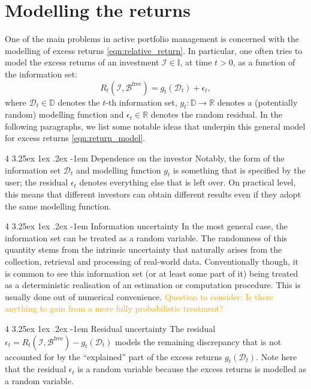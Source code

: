 \documentclass[12pt]{article}
\makeatletter
\renewcommand\paragraph{%
	\@startsection{paragraph}
	{4}
	{\z@}
	{3.25ex \@plus1ex \@minus.2ex}
	{-1em}
	{\normalfont\normalsize\bfseries\maybe@addperiod}%
}
\newcommand{\maybe@addperiod}[1]{%
	#1\@addpunct{.}%
}
\makeatother
\begin{document}
\section{Modelling the returns}
One of the main problems in active portfolio management is concerned with the modelling of excess returns \eqref{eqn:relative_return}. In particular, one often tries to model the excess returns of an investment $\mathcal{I} \in \mathbb{I}$, at time $t > 0$, as a function of the information set:
\begin{equation}
    R_t(\mathcal{I}, \mathcal{B}^{\text{free}}) = g_t(\mathcal{D}_t) + \epsilon_t,
    \label{eqn:return_model}
\end{equation}
where $\mathcal{D}_t \in \mathbb{D}$ denotes the $t$-th information set, $g_t: \mathbb{D} \rightarrow \mathbb{R}$ denotes a (potentially random) modelling function and $\epsilon_t \in \mathbb{R}$ denotes the random residual. In the following paragraphs, we list some notable ideas that underpin this general model for excess returns \eqref{eqn:return_model}.

\paragraph{Dependence on the investor} Notably, the form of the information set $\mathcal{D}_t$ and modelling function $g_t$ is something that is specified by the user; the residual $\epsilon_t$ denotes everything else that is left over. On practical level, this means that different investors can obtain different results even if they adopt the same modelling function. 

\paragraph{Information uncertainty} In the most general case, the information set can be treated as a random variable. The randomness of this quantity stems from the intrinsic uncertainty that naturally arises from the collection, retrieval and processing of real-world data. Conventionally though, it is common to see this information set (or at least some part of it) being treated as a deterministic realisation of an estimation or computation procedure. This is usually done out of numerical convenience. \textcolor{orange}{Question to consider: Is there anything to gain from a more fully probabilistic treatment?}

\paragraph{Residual uncertainty} The residual $\epsilon_t = R_t(\mathcal{I}, \mathcal{B}^{\text{free}}) - g_t(\mathcal{D}_t)$ models the remaining discrepancy that is not accounted for by the ``explained'' part of the excess returns $g_t(\mathcal{D}_t)$. Note here that the residual $\epsilon_t$ is a random variable because the excess returns is modelled as a random variable.
\end{document}
